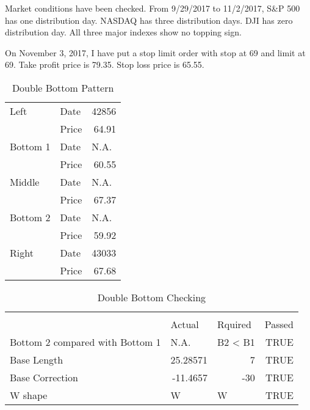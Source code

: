 \documentclass{article}
\begin{document}
Market conditions have been checked. From 9/29/2017 to 11/2/2017, S\&P 500 has one distribution day. NASDAQ has three distribution days. DJI has zero distribution day. All three major indexes show no topping sign.

On November 3, 2017, I have put a stop limit order with stop at 69 and limit at 69. Take profit price is 79.35. Stop loss price is 65.55.

\begin{table}[htbp]
  \caption{Double Bottom Pattern}
    \begin{tabular}{rlr}
    \multicolumn{1}{l}{Left} & Date  & 42856 \\
          & Price & 64.91 \\
    \multicolumn{1}{l}{Bottom 1} & Date  & \multicolumn{1}{l}{N.A.} \\
          & Price & 60.55 \\
    \multicolumn{1}{l}{Middle} & Date  & \multicolumn{1}{l}{N.A.} \\
          & Price & 67.37 \\
    \multicolumn{1}{l}{Bottom 2} & Date  & \multicolumn{1}{l}{N.A.} \\
          & Price & 59.92 \\
    \multicolumn{1}{l}{Right} & Date  & 43033 \\
          & Price & 67.68 \\
    \end{tabular}%
  \label{tab:double bottom pattern}%
\end{table}%

\begin{table}[htbp]
  \caption{Double Bottom Checking}
    \begin{tabular}{lllr}
          &       &       &  \\
          & Actual & Rquired & \multicolumn{1}{l}{Passed} \\
    Bottom 2 compared with Bottom 1 & N.A.  & B2 < B1 & TRUE \\
    Base Length & \multicolumn{1}{r}{25.28571} & \multicolumn{1}{r}{7} & TRUE \\
    Base Correction & \multicolumn{1}{r}{-11.4657} & \multicolumn{1}{r}{-30} & TRUE \\
    W shape & W     & W     & TRUE \\
    \end{tabular}%
  \label{tab:checking}%
\end{table}%
\end{document}
